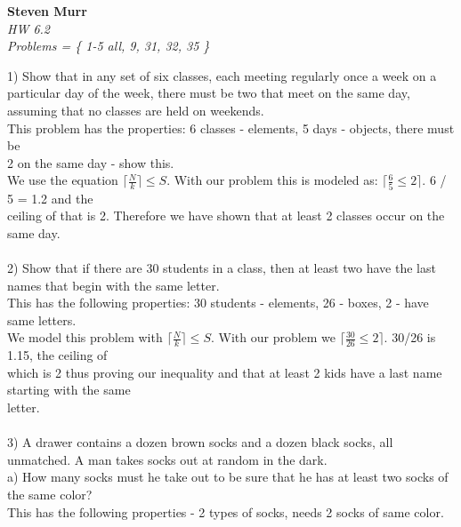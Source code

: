 \documentclass{article}
\begin{document}
\setcounter{totalnumber}{5}
   \begin{flushright}
      \Large\textbf{Steven Murr}\\
      \large\textit{HW 6.2} \\
      \large\textit{ Problems = \{ 1-5 all, 9, 31, 32, 35 \} } 
   \end{flushright}
\begin{flushleft}
\makeatletter%
\setlength{\@fptop}{5pt}
\makeatother
\setlength\parindent{0pt}1) Show that in any set of six classes, each meeting regularly once a week on a particular day of the week, there must be two that meet on the same day, assuming that no classes are held on weekends. \\
\setlength\parindent{24pt} This problem has the properties: 6 classes - elements, 5 days - objects, there must be \\2 on the same day - show this. \\
\setlength\parindent{24pt}We use the equation $\lceil \frac{N}{k} \rceil \leq S$.  With our problem this is modeled as: $\lceil \frac{6}{5} \leq 2 \rceil$.  6 / 5 = 1.2 and the \\ceiling of that is 2.  Therefore we have shown that at least 2 classes occur on the same day. \\
~\\
\setlength\parindent{0pt}2) Show that if there are 30 students in a class, then at least two have the last names that begin with the same letter. \\
\setlength\parindent{24pt}This has the following properties: 30 students - elements, 26 - boxes, 2 - have same letters. \\
\setlength\parindent{24pt}We model this problem with $\lceil \frac{N}{k} \rceil \leq S$.  With our problem we $\lceil \frac{30}{26} \leq 2 \rceil$.  30/26 is 1.15, the ceiling of \\which is 2 thus proving our inequality and that at least 2 kids have a last name starting with the same \\letter. \\
~\\
\setlength\parindent{0pt}3) A drawer contains a dozen brown socks and a dozen black socks, all unmatched.  A man takes socks out at random in the dark. \\
\setlength\parindent{24pt}a) How many socks must he take out to be sure that he has at least two socks of the same color? \\
\setlength\parindent{48pt} This has the following properties - 2 types of socks, needs 2 socks of same color.  \\

\end{flushleft}
\end{document}

